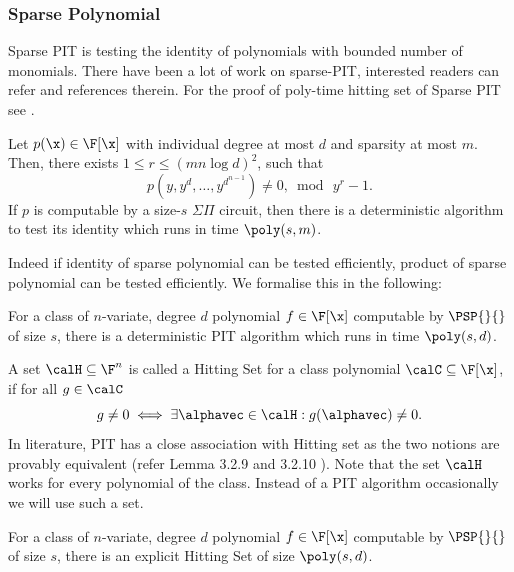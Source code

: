 \subsubsection*{Sparse Polynomial}
Sparse PIT is testing the identity of polynomials with bounded number of monomials. There have been a lot of work on sparse-PIT, interested readers can refer \cite{ben1988deterministic,klivans2001randomness} and references therein. For the proof of poly-time hitting set of Sparse PIT see \cite[Thm.~2.1]{saxena2009progress}.

\begin{theorem} \label{thm:sparse-ks}
Let $p(\x) \in \F[\x]$ with individual degree at most $d$ and sparsity at most $m$. Then, there exists $1 \le r \le (mn \log d)^2$, such that \[ p(y,y^d,\hdots,y^{d^{n-1}}) \ne 0,\bmod\,y^r-1.\] If $p$ is computable by a size-$s$ $\Sigma \Pi$ circuit, then there is a deterministic algorithm to test its identity which runs in time $\poly(s,m)$.
\end{theorem}

Indeed if identity of sparse polynomial can be tested efficiently, product of sparse polynomial can be tested efficiently. We formalise this in the following:

\begin{lemma} \label{lem:prod-sparse-PIT}
    For a class of $n$-variate, degree $d$ polynomial $f \in \F[\x]$ computable by $\PSP{}{}$ of size $s$, there is a deterministic PIT algorithm which runs in time $\poly(s,d)$.
\end{lemma}

A set $\calH \subseteq \F^n$ is called a Hitting Set for a class polynomial $\calC \subseteq \F[\x]$, if for all $g \in \calC$ \[ g \neq 0 \iff \exists \alphavec \in \calH : g(\alphavec) \neq 0.\]
In literature, PIT has a close association with Hitting set as the two notions are provably equivalent (refer Lemma 3.2.9 and 3.2.10 \cite{Forbes14Thesis}). Note that the set $\calH$ works for every polynomial of the class. Instead of a PIT algorithm occasionally we will use such a set.

\begin{lemma} \label{lem:prod-sparse-hs}
    For a class of $n$-variate, degree $d$ polynomial $f \in \F[\x]$ computable by $\PSP{}{}$ of size $s$, there is an explicit Hitting Set of size $\poly(s,d)$.
\end{lemma}

